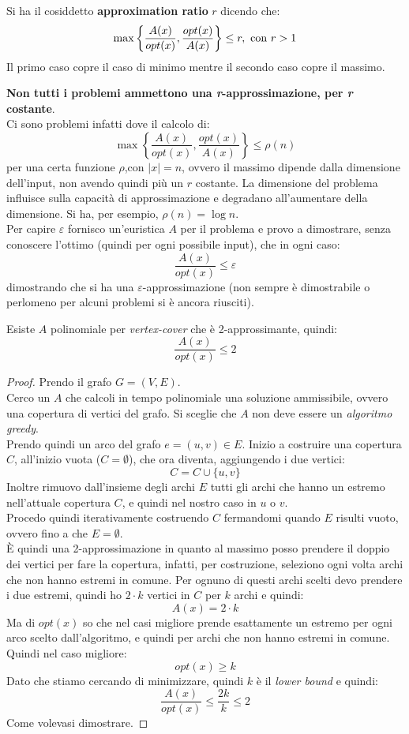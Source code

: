 \documentclass[a4paper,12pt, oneside]{book}
\begin{document}
\begin{definizione}
  Si ha il cosiddetto \textbf{approximation ratio} $r$ dicendo che:
  \[\max\left\{\frac{A(x)}{opt(x)},\frac{opt(x)}{A(x)}\right\}\leq r,\mbox{
      \textnormal{con} }r>1\] 
  Il primo caso copre il caso di minimo mentre il secondo caso copre il massimo.
\end{definizione}
\textbf{Non tutti i problemi ammettono una \textit{r}-approssimazione, per
  \textit{r} costante}.\\
Ci sono problemi infatti dove il calcolo di:
\[\max\left\{\frac{A(x)}{opt(x)},\frac{opt(x)}{A(x)}\right\}\leq \rho(n)\]
per una certa funzione $\rho$,con $|x|=n$,
ovvero il massimo dipende dalla
dimensione dell'input, non avendo quindi più un $r$ costante. La dimensione del
problema influisce sulla capacità di approssimazione e degradano all'aumentare
della dimensione. Si ha, per esempio, $\rho(n)=\log n$.\\
Per capire $\varepsilon$ fornisco un'euristica $A$ per il problema e provo a
dimostrare, senza conoscere l'ottimo (quindi per ogni possibile input), che in
ogni caso:
\[\frac{A(x)}{opt(x)}\leq \varepsilon\]
dimostrando che si ha una $\varepsilon$-approssimazione (non sempre è
dimostrabile o perlomeno per alcuni problemi si è ancora riusciti).
\begin{teorema}
  Esiste $A$ polinomiale per \textit{vertex-cover} che è 2-approssimante,
  quindi:
  \[\frac{A(x)}{opt(x)}\leq 2\]
\end{teorema}
\begin{proof}
  Prendo il grafo $G=(V,E)$.\\
  Cerco un $A$ che calcoli in tempo polinomiale una soluzione ammissibile,
  ovvero una copertura di vertici del grafo. Si sceglie che $A$ non deve essere
  un \textit{algoritmo greedy}.\\
  Prendo quindi un arco del grafo $e=(u,v)\in E$. Inizio a costruire una
  copertura $C$, all'inizio vuota ($C=\emptyset$), che ora diventa, aggiungendo
  i due vertici:
  \[C=C\cup\{u,v\}\]
  Inoltre rimuovo dall'insieme degli archi $E$ tutti gli archi che hanno un
  estremo nell'attuale copertura $C$, e quindi nel nostro caso in $u$ o $v$.\\
  Procedo quindi iterativamente costruendo $C$ fermandomi quando $E$ risulti
  vuoto, ovvero fino a che $E=\emptyset$.\\
  È quindi una 2-approssimazione in quanto al massimo posso prendere il doppio
  dei vertici per fare la copertura, infatti, per costruzione, seleziono ogni
  volta archi che non hanno estremi in comune. Per ognuno di questi archi scelti
  devo prendere i due estremi, quindi ho $2\cdot k$ vertici in $C$ per $k$ archi
  e quindi:
  \[A(x)=2\cdot k\]
  Ma di $opt(x)$ so che nel casi migliore prende esattamente un estremo per ogni
  arco scelto dall'algoritmo, e quindi per archi che non hanno estremi in
  comune. Quindi nel caso migliore:
  \[opt(x)\geq k\]
  Dato che stiamo cercando di minimizzare, quindi $k$ è il \textit{lower bound} e
  quindi:
  \[\frac{A(x)}{opt(x)}\leq\frac{2k}{k}\leq 2\]
  Come volevasi dimostrare.
\end{proof}
\end{document}
